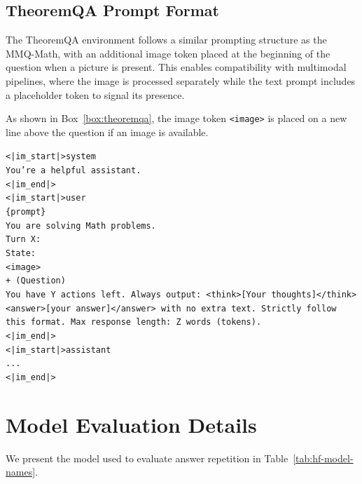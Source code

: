 \subsection{TheoremQA Prompt Format}
The TheoremQA environment follows a similar prompting structure as the MMQ-Math, with an additional image token placed at the beginning of the question when a picture is present. This enables compatibility with multimodal pipelines, where the image is processed separately while the text prompt includes a placeholder token to signal its presence.

As shown in Box~\ref{box:theoremqa}, the image token \texttt{<image>} is placed on a new line above the question if an image is available.

\begin{tcolorbox}[breakable, colback=gray!2, colframe=black, boxrule=0.5pt, arc=2pt, width=\linewidth, title=Box 3: TheoremQA Prompt Template]
\label{box:theoremqa}
\texttt{<|im\_start|>system\\
You're a helpful assistant.\\
<|im\_end|>\\
<|im\_start|>user\\
\{prompt\}\\
You are solving Math problems.\\
Turn X:\\
State:\\
<image>\\
+ (Question)\\
You have Y actions left. Always output: <think>[Your thoughts]</think><answer>[your answer]</answer> with no extra text. Strictly follow this format. Max response length: Z words (tokens).\\
<|im\_end|>\\
<|im\_start|>assistant\\
...\\
<|im\_end|>}
\end{tcolorbox}

\section{Model Evaluation Details}
\label{sec:model-detail}
We present the model used to evaluate answer repetition in Table~\ref{tab:hf-model-names}.

